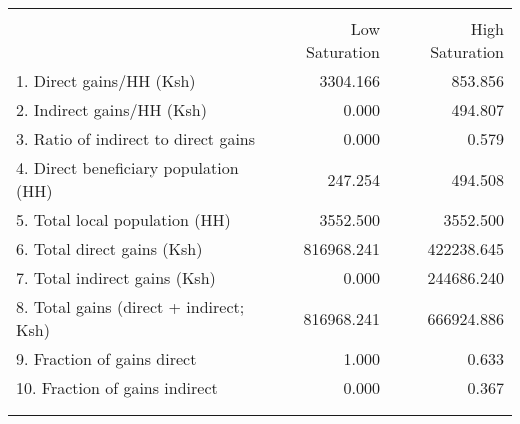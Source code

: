 \begin{tabular}{lrr}
\\[-1.8ex]\hline 
 \hline \\[-1.8ex]
 & Low Saturation & High Saturation \\
\midrule
1. Direct gains/HH (Ksh) & 3304.166 & 853.856 \\
2. Indirect gains/HH (Ksh) & 0.000 & 494.807 \\
3. Ratio of indirect to direct gains & 0.000 & 0.579 \\
4. Direct beneficiary population (HH) & 247.254 & 494.508 \\
5. Total local population (HH) & 3552.500 & 3552.500 \\
6. Total direct gains (Ksh) & 816968.241 & 422238.645 \\
7. Total indirect gains (Ksh) & 0.000 & 244686.240 \\
8. Total gains (direct + indirect; Ksh) & 816968.241 & 666924.886 \\
9. Fraction of gains direct & 1.000 & 0.633 \\
10. Fraction of gains indirect & 0.000 & 0.367 \\
\\[-1.8ex]\hline 
 \hline \\[-1.8ex]
\end{tabular}
